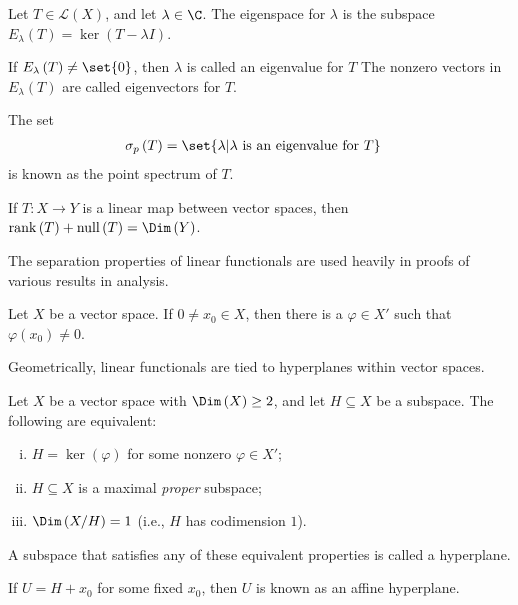 \begin{definition}
  Let $T\in \mathcal{L}\left(X\right)$, and let $\lambda\in \C$. The eigenspace for $\lambda$ is the subspace $E_{\lambda}\left(T\right) = \ker\left(T - \lambda I\right)$.\newline

  If $E_{\lambda}\left(T\right) \neq \set{0}$, then $\lambda$ is called an eigenvalue for $T$ The nonzero vectors in $E_{\lambda}\left(T\right)$ are called eigenvectors for $T$.\newline

  The set
  \begin{align*}
    \sigma_p\left(T\right) &= \set{\lambda | \lambda\text{ is an eigenvalue for }T}
  \end{align*}
  is known as the point spectrum of $T$.
\end{definition}
\begin{theorem}
  If $T\colon X\rightarrow Y$ is a linear map between vector spaces, then $\operatorname{rank}\left(T\right) + \operatorname{null}\left(T\right) = \Dim\left(Y\right)$.
\end{theorem}
The separation properties of linear functionals are used heavily in proofs of various results in analysis.
\begin{proposition}
  Let $X$ be a vector space. If $0\neq x_0\in X$, then there is a $\varphi\in X'$ such that $\varphi\left(x_0\right) \neq 0$.
\end{proposition}
Geometrically, linear functionals are tied to hyperplanes within vector spaces.
\begin{proposition}
  Let $X$ be a vector space with $\Dim\left(X\right) \geq 2$, and let $H\subseteq X$ be a subspace. The following are equivalent:
  \begin{enumerate}[(i)]
    \item $H=\ker\left(\varphi\right)$ for some nonzero $\varphi\in X'$;
    \item $H\subseteq X$ is a maximal \textit{proper} subspace;
    \item $\Dim\left(X/H\right) = 1$ (i.e., $H$ has codimension $1$).
  \end{enumerate}
  A subspace that satisfies any of these equivalent properties is called a hyperplane.\newline

  If $U = H + x_0$ for some fixed $x_0$, then $U$ is known as an affine hyperplane.
\end{proposition}
